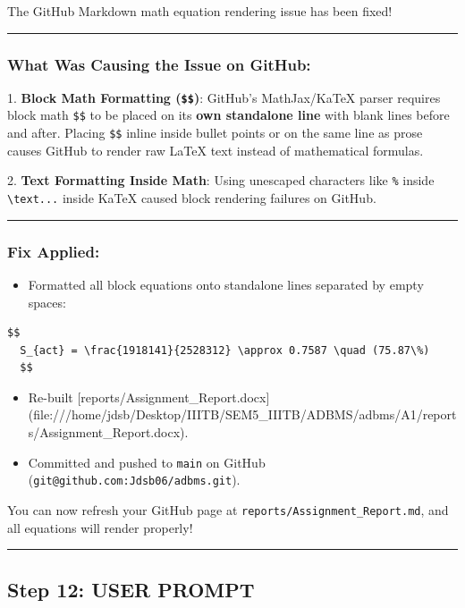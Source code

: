 \documentclass[11pt,a4paper]{article}
\begin{document}
{The GitHub Markdown math equation rendering issue has been fixed!


\hrule


\subsubsection{What Was Causing the Issue on GitHub:}
1. \textbf{Block Math Formatting (\texttt{\$\$})}: GitHub's MathJax/KaTeX parser requires block math \texttt{\$\$} to be placed on its \textbf{own standalone line} with blank lines before and after. Placing \texttt{\$\$} inline inside bullet points or on the same line as prose causes GitHub to render raw LaTeX text instead of mathematical formulas.

2. \textbf{Text Formatting Inside Math}: Using unescaped characters like \texttt{\%} inside \texttt{\textbackslash{}text{...}} inside KaTeX caused block rendering failures on GitHub.


\hrule


\subsubsection{Fix Applied:}
\begin{itemize}
\item Formatted all block equations onto standalone lines separated by empty spaces:
\end{itemize}
\begin{lstlisting}[language=markdown]
  $$
  S_{act} = \frac{1918141}{2528312} \approx 0.7587 \quad (75.87\%)
  $$
\end{lstlisting}

\begin{itemize}
\item Re-built [reports/Assignment\_Report.docx](file:///home/jdsb/Desktop/IIITB/SEM5\_IIITB/ADBMS/adbms/A1/reports/Assignment\_Report.docx).
\item Committed and pushed to \texttt{main} on GitHub (\texttt{git@github.com:Jdsb06/adbms.git}).
\end{itemize}

You can now refresh your GitHub page at \texttt{reports/Assignment\_Report.md}, and all equations will render properly!


\hrule

\subsection{Step 12: USER PROMPT}

}
\end{document}
